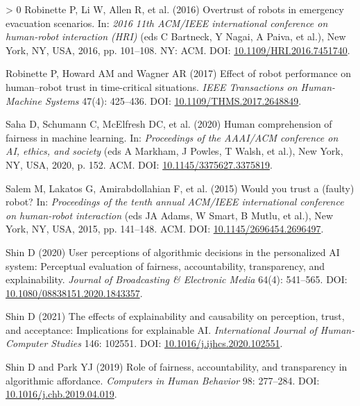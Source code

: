 \documentclass{article}
\newlength{\cslhangindent}
\newenvironment{CSLReferences}[3] %
 {%
  \setlength{\parindent}{0pt}
  \ifodd #1 \everypar{\setlength{\hangindent}{\cslhangindent}}\ignorespaces\fi
  \ifnum #2 > 0
  \setlength{\parskip}{#2\baselineskip}
  \fi
 }%
 {}
\begin{document}
\begin{CSLReferences}{1}{0}
\leavevmode\hypertarget{ref-Robinette.2016}{}%
Robinette P, Li W, Allen R, et al. (2016) Overtrust of robots in
emergency evacuation scenarios. In: \emph{2016 11th ACM/IEEE
international conference on human-robot interaction (HRI)} (eds C
Bartneck, Y Nagai, A Paiva, et al.), New York, NY, USA, 2016, pp.
101--108. {NY: ACM}. DOI:
\href{https://doi.org/10.1109/HRI.2016.7451740}{10.1109/HRI.2016.7451740}.

\leavevmode\hypertarget{ref-Robinette.2017}{}%
Robinette P, Howard AM and Wagner AR (2017) Effect of robot performance
on human--robot trust in time-critical situations. \emph{IEEE
Transactions on Human-Machine Systems} 47(4): 425--436. DOI:
\href{https://doi.org/10.1109/THMS.2017.2648849}{10.1109/THMS.2017.2648849}.

\leavevmode\hypertarget{ref-Saha.2020}{}%
Saha D, Schumann C, McElfresh DC, et al. (2020) Human comprehension of
fairness in machine learning. In: \emph{Proceedings of the AAAI/ACM
conference on AI, ethics, and society} (eds A Markham, J Powles, T
Walsh, et al.), New York, NY, USA, 2020, p. 152. ACM. DOI:
\href{https://doi.org/10.1145/3375627.3375819}{10.1145/3375627.3375819}.

\leavevmode\hypertarget{ref-Salem.2015}{}%
Salem M, Lakatos G, Amirabdollahian F, et al. (2015) Would you trust a
(faulty) robot? In: \emph{Proceedings of the tenth annual ACM/IEEE
international conference on human-robot interaction} (eds JA Adams, W
Smart, B Mutlu, et al.), New York, NY, USA, 2015, pp. 141--148. ACM.
DOI:
\href{https://doi.org/10.1145/2696454.2696497}{10.1145/2696454.2696497}.

\leavevmode\hypertarget{ref-Shin.2020}{}%
Shin D (2020) User perceptions of algorithmic decisions in the
personalized AI system: Perceptual evaluation of fairness,
accountability, transparency, and explainability. \emph{Journal of
Broadcasting {\&} Electronic Media} 64(4): 541--565. DOI:
\href{https://doi.org/10.1080/08838151.2020.1843357}{10.1080/08838151.2020.1843357}.

\leavevmode\hypertarget{ref-Shin.2021}{}%
Shin D (2021) The effects of explainability and causability on
perception, trust, and acceptance: Implications for explainable AI.
\emph{International Journal of Human-Computer Studies} 146: 102551. DOI:
\href{https://doi.org/10.1016/j.ijhcs.2020.102551}{10.1016/j.ijhcs.2020.102551}.

\leavevmode\hypertarget{ref-Shin.2019}{}%
Shin D and Park YJ (2019) Role of fairness, accountability, and
transparency in algorithmic affordance. \emph{Computers in Human
Behavior} 98: 277--284. DOI:
\href{https://doi.org/10.1016/j.chb.2019.04.019}{10.1016/j.chb.2019.04.019}.


\end{CSLReferences}
\end{document}
